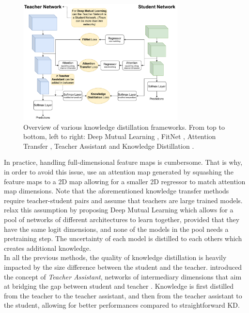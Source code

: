 \begin{figure}[htbp]
    \centering
    \includegraphics[width=0.75\textwidth]{chapter_sota/assets/kd_frameworks.pdf}
    \caption{Overview of various knowledge distillation frameworks. From top to
    bottom, left to right: Deep Mutual Learning
    \cite{DBLP:conf/cvpr/ZhangXHL18}, FitNet
    \cite{DBLP:journals/corr/RomeroBKCGB14}, Attention Transfer
    \cite{DBLP:conf/iclr/ZagoruykoK17}, Teacher Assistant
    \cite{DBLP:conf/aaai/MirzadehFLLMG20} and Knowledge Distillation
    \cite{DBLP:journals/corr/HintonVD15}.}
    \label{fig:sota:kd_frameworks}
\end{figure}

In practice, handling full-dimensional feature maps is cumbersome. That is why,
in order to avoid this issue, \cite{DBLP:conf/iclr/ZagoruykoK17} use an
attention map generated by squashing the feature maps to a 2D map allowing for a
smaller 2D regressor to match attention map dimensions. Note that the
aforementioned knowledge transfer methods require teacher-student pairs and
assume that teachers are large trained models. \cite{DBLP:conf/cvpr/ZhangXHL18}
relax this assumption by proposing Deep Mutual Learning which allows for a pool
of networks of different architectures to learn together, provided that they
have the same logit dimensions, and none of the models in the pool needs a
pretraining step. The uncertainty of each model is distilled to each others
which creates additional knowledge.\\

In all the previous methods, the quality of knowledge distillation is heavily
impacted by the size difference between the student and the teacher.
\citeauthor{DBLP:conf/aaai/MirzadehFLLMG20} introduced the concept of
\emph{Teacher Assistant}, networks of intermediary dimensions that aim at
bridging the gap between student and teacher
\cite{DBLP:conf/aaai/MirzadehFLLMG20}. Knowledge is first distilled from the
teacher to the teacher assistant, and then from the teacher assistant to the
student, allowing for better performances compared to straightforward \ac{KD}.\\

